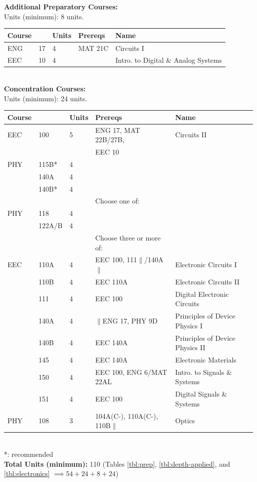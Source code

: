 \documentclass[12pt]{article}
\begin{document}
\newpage
{}
\vskip 0.25cm
\noindent
{\bf Additional Preparatory Courses:  }\\
Units (minimum):  8 units. \\
\begin{tabular}{|lllll|}
\hline
Course & & Units & Prereqs & Name \\
\hline
ENG & 17     & 4 & MAT 21C & Circuits I\\
EEC & 10 & 4 & & Intro. to Digital \& Analog Systems\\
\hline
\end{tabular}\\
\vskip 0.25cm
\noindent
{\bf Concentration Courses:}\\
Units (minimum):  24 units.\\
\begin{tabular}{|lllll|}
\hline
Course & & Units & Prereqs & Name \\
\hline
EEC & 100    & 5 & ENG 17, MAT 22B/27B, & Circuits II\\
    &        &   & EEC 10 & \\
PHY & 115B*  & 4 & & \\
    & 140A   & 4 & & \\
    & 140B*  & 4 & & \\
\hline
\hline
    & & & Choose one of: & \\
PHY & 118    & 4 & & \\
    & 122A/B & 4 & & \\
\hline
\hline
    & & &  Choose three or more of: & \\
EEC & 110A  & 4 & EEC 100, 111$\parallel$/140A$\parallel$ & Electronic Circuits I \\
    & 110B  & 4 & EEC 110A          & Electronic Circuits II\\
    & 111   & 4 & EEC 100           & Digital Electronic Circuits \\
    & 140A  & 4 & $\parallel$ENG 17, PHY 9D & Principles of Device Physics I\\
    & 140B  & 4 & EEC 140A          & Principles of Device Physics II\\
    & 145   & 4 & EEC 140A          & Electronic Materials\\
    & 150   & 4 & EEC 100, ENG 6/MAT 22AL & Intro. to Signals \& Systems \\
    & 151   & 4 & EEC 100           & Digital Signals \& Systems \\
PHY & 108   & 3 & 104A(C-), 110A(C-), 110B$\parallel$ & Optics \\
\hline
\end{tabular}\\
*: recommended \\
\noindent
{\bf Total Units (minimum):} 110 (Tables \ref{tbl:prep}, \ref{tbl:depth-applied}, and \ref{tbl:electronics} $\implies 54+24+8+24$) \\
\end{document}
